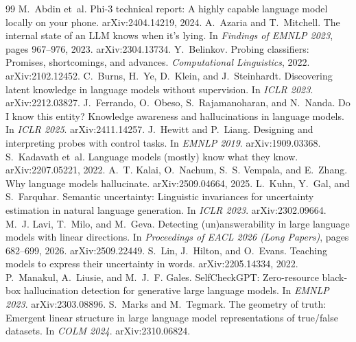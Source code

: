 \documentclass[10pt]{article}
\begin{document}
\begin{thebibliography}{99}\small
\setlength{\itemsep}{1pt}
 M.~Abdin et~al. Phi-3 technical report: A highly capable language model locally on your phone. arXiv:2404.14219, 2024.
 A.~Azaria and T.~Mitchell. The internal state of an LLM knows when it's lying. In \emph{Findings of EMNLP 2023}, pages 967--976, 2023. arXiv:2304.13734.
 Y.~Belinkov. Probing classifiers: Promises, shortcomings, and advances. \emph{Computational Linguistics}, 2022. arXiv:2102.12452.
 C.~Burns, H.~Ye, D.~Klein, and J.~Steinhardt. Discovering latent knowledge in language models without supervision. In \emph{ICLR 2023}. arXiv:2212.03827.
 J.~Ferrando, O.~Obeso, S.~Rajamanoharan, and N.~Nanda. Do I know this entity? Knowledge awareness and hallucinations in language models. In \emph{ICLR 2025}. arXiv:2411.14257.
 J.~Hewitt and P.~Liang. Designing and interpreting probes with control tasks. In \emph{EMNLP 2019}. arXiv:1909.03368.
 S.~Kadavath et~al. Language models (mostly) know what they know. arXiv:2207.05221, 2022.
 A.~T. Kalai, O.~Nachum, S.~S. Vempala, and E.~Zhang. Why language models hallucinate. arXiv:2509.04664, 2025.
 L.~Kuhn, Y.~Gal, and S.~Farquhar. Semantic uncertainty: Linguistic invariances for uncertainty estimation in natural language generation. In \emph{ICLR 2023}. arXiv:2302.09664.
 M.~J. Lavi, T.~Milo, and M.~Geva. Detecting (un)answerability in large language models with linear directions. In \emph{Proceedings of EACL 2026 (Long Papers)}, pages 682--699, 2026. arXiv:2509.22449.
 S.~Lin, J.~Hilton, and O.~Evans. Teaching models to express their uncertainty in words. arXiv:2205.14334, 2022.
 P.~Manakul, A.~Liusie, and M.~J.~F. Gales. SelfCheckGPT: Zero-resource black-box hallucination detection for generative large language models. In \emph{EMNLP 2023}. arXiv:2303.08896.
 S.~Marks and M.~Tegmark. The geometry of truth: Emergent linear structure in large language model representations of true/false datasets. In \emph{COLM 2024}. arXiv:2310.06824.

\end{thebibliography}
\end{document}
